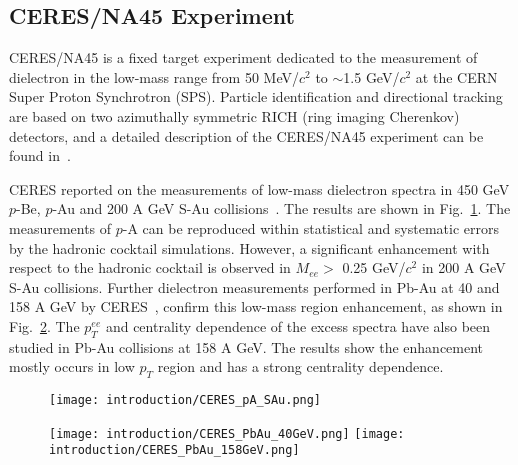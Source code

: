 \subsection{CERES/NA45 Experiment}
CERES/NA45 is a fixed target experiment dedicated to the measurement of dielectron in the low-mass range from 50 MeV/$c^{2}$ to $\sim$1.5 GeV/$c^{2}$ at the CERN Super Proton Synchrotron (SPS). Particle identification and directional tracking are based on two azimuthally symmetric RICH (ring imaging Cherenkov) detectors, and a detailed description of the CERES/NA45 experiment can be found in~\cite{CERES:experiment}.
 
CERES reported on the measurements of low-mass dielectron spectra in 450 GeV $p$-Be, $p$-Au and 200 A GeV S-Au collisions~\cite{CERES:dielectron0,CERES:dielectron1}. The results are shown in Fig.~\ref{ceres_pASAu}. The measurements of $p$-A can be reproduced within statistical and systematic errors by the hadronic cocktail simulations. However, a significant enhancement with respect to the hadronic cocktail is observed  in $M_{ee}>$ 0.25 GeV/$c^{2}$ in 200 A GeV S-Au collisions. Further dielectron measurements performed in Pb-Au at 40 and 158 A GeV by CERES~\cite{CERES:dielectron2,CERES:dielectron3}, confirm this low-mass region enhancement, as shown in Fig.~\ref{ceres_PbAu}. The $p_{T}^{ee}$ and centrality dependence of the excess spectra have also been studied in Pb-Au collisions at 158 A GeV. The results show the enhancement mostly occurs in low $p_{T}$ region and has a strong centrality dependence. 

\begin{figure}[htbp]
\centering
\texttt{[image: introduction/CERES\_pA\_SAu.png]}
 \label{ceres_pASAu}
\end{figure}

\begin{figure}[htbp]
\centering
\texttt{[image: introduction/CERES\_PbAu\_40GeV.png]}
\texttt{[image: introduction/CERES\_PbAu\_158GeV.png]}
\label{ceres_PbAu}
\end{figure}

